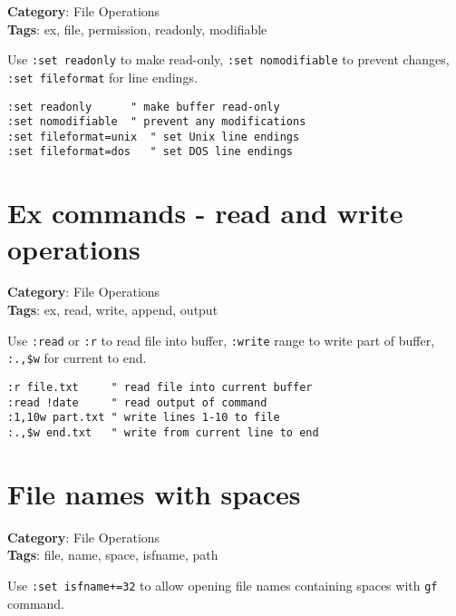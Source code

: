 {{{{{{\textbf{Category}: File Operations\\ \textbf{Tags}: ex, file, permission, readonly, modifiable
\vspace{0.5cm}

Use {\footnotesize \Verb§:set readonly§} to make read-only, {\footnotesize \Verb§:set nomodifiable§} to prevent changes, {\footnotesize \Verb§:set fileformat§} for line endings.

\begin{Exa*}{}
\begin{Verbatim}[fontsize=\footnotesize, breaklines, breakanywhere]
:set readonly      " make buffer read-only
:set nomodifiable  " prevent any modifications
:set fileformat=unix  " set Unix line endings
:set fileformat=dos   " set DOS line endings
\end{Verbatim}
\end{Exa*}

\section{Ex commands - read and write operations}

\textbf{Category}: File Operations\\ \textbf{Tags}: ex, read, write, append, output
\vspace{0.5cm}

Use {\footnotesize \Verb§:read§} or {\footnotesize \Verb§:r§} to read file into buffer, {\footnotesize \Verb§:write§} range to write part of buffer, {\footnotesize \Verb§:.,$w§} for current to end.

\begin{Exa*}{}
\begin{Verbatim}[fontsize=\footnotesize, breaklines, breakanywhere]
:r file.txt     " read file into current buffer
:read !date     " read output of command
:1,10w part.txt " write lines 1-10 to file
:.,$w end.txt   " write from current line to end
\end{Verbatim}
\end{Exa*}

\section{File names with spaces}

\textbf{Category}: File Operations\\ \textbf{Tags}: file, name, space, isfname, path
\vspace{0.5cm}

Use {\footnotesize \Verb§:set isfname+=32§} to allow opening file names containing spaces with {\footnotesize \Verb§gf§} command.

}}}}}}
